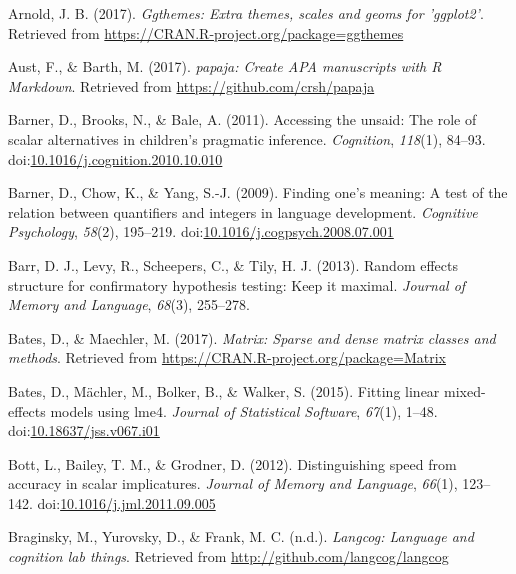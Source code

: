 \documentclass[man]{apa6}
\theoremstyle{definition}
\theoremstyle{definition}
\theoremstyle{definition}
\theoremstyle{remark}
\begin{document}
\setlength{\parindent}{-0.5in} \setlength{\leftskip}{0.5in}

\hypertarget{refs}{}
\hypertarget{ref-R-ggthemes}{}
Arnold, J. B. (2017). \emph{Ggthemes: Extra themes, scales and geoms for
'ggplot2'}. Retrieved from
\url{https://CRAN.R-project.org/package=ggthemes}

\hypertarget{ref-R-papaja}{}
Aust, F., \& Barth, M. (2017). \emph{papaja: Create APA manuscripts with
R Markdown}. Retrieved from \url{https://github.com/crsh/papaja}

\hypertarget{ref-barner2011}{}
Barner, D., Brooks, N., \& Bale, A. (2011). Accessing the unsaid: The
role of scalar alternatives in children's pragmatic inference.
\emph{Cognition}, \emph{118}(1), 84--93.
doi:\href{https://doi.org/10.1016/j.cognition.2010.10.010}{10.1016/j.cognition.2010.10.010}

\hypertarget{ref-barner2009}{}
Barner, D., Chow, K., \& Yang, S.-J. (2009). Finding one's meaning: A
test of the relation between quantifiers and integers in language
development. \emph{Cognitive Psychology}, \emph{58}(2), 195--219.
doi:\href{https://doi.org/10.1016/j.cogpsych.2008.07.001}{10.1016/j.cogpsych.2008.07.001}

\hypertarget{ref-barr2013random}{}
Barr, D. J., Levy, R., Scheepers, C., \& Tily, H. J. (2013). Random
effects structure for confirmatory hypothesis testing: Keep it maximal.
\emph{Journal of Memory and Language}, \emph{68}(3), 255--278.

\hypertarget{ref-R-Matrix}{}
Bates, D., \& Maechler, M. (2017). \emph{Matrix: Sparse and dense matrix
classes and methods}. Retrieved from
\url{https://CRAN.R-project.org/package=Matrix}

\hypertarget{ref-R-lme4}{}
Bates, D., Mächler, M., Bolker, B., \& Walker, S. (2015). Fitting linear
mixed-effects models using lme4. \emph{Journal of Statistical Software},
\emph{67}(1), 1--48.
doi:\href{https://doi.org/10.18637/jss.v067.i01}{10.18637/jss.v067.i01}

\hypertarget{ref-bott2012}{}
Bott, L., Bailey, T. M., \& Grodner, D. (2012). Distinguishing speed
from accuracy in scalar implicatures. \emph{Journal of Memory and
Language}, \emph{66}(1), 123--142.
doi:\href{https://doi.org/10.1016/j.jml.2011.09.005}{10.1016/j.jml.2011.09.005}

\hypertarget{ref-R-langcog}{}
Braginsky, M., Yurovsky, D., \& Frank, M. C. (n.d.). \emph{Langcog:
Language and cognition lab things}. Retrieved from
\url{http://github.com/langcog/langcog}
\end{document}
